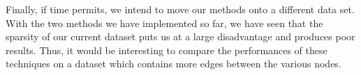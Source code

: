 \documentclass[10pt, letterpaper]{article}
\begin{document}
Finally, if time permits, we intend to move our methods onto a different
data set. With the two methods we have implemented so far, we have seen
that the sparsity of our current dataset puts us at a large disadvantage
and produces poor results. Thus, it would be interesting to compare the
performances of these techniques on a dataset which contains more edges
between the various nodes.
\end{document}
